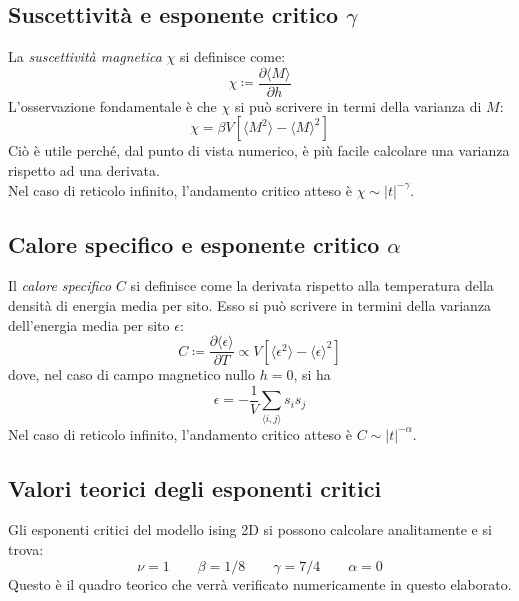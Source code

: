 \documentclass[10pt,a4paper]{article}
\begin{document}
\subsection*{Suscettività e esponente critico $\gamma$}
La \emph{suscettività magnetica} $\chi$ si definisce come:
\begin{equation}\label{eq:suscettivita}
	\chi \coloneqq\frac{\partial \langle M \rangle}{\partial h} 
\end{equation}
L'osservazione fondamentale è che $\chi$ si può scrivere in termi della varianza di $M$:
\begin{equation}\label{eq:fluttuazionesuscettivita}
\chi= \beta V[\langle M ^2 \rangle - \langle M\rangle^2] 
\end{equation}
Ciò è utile perché, dal punto di vista numerico, è più facile calcolare una varianza rispetto ad una derivata.\\
Nel caso di reticolo infinito, l'andamento critico atteso è $\chi \sim |t|^{-\gamma}$.

\subsection*{Calore specifico  e esponente critico $\alpha$}
Il \emph{calore specifico} $C$ si definisce come la derivata rispetto alla temperatura della densità di energia media per sito. Esso si può scrivere in termini della varianza dell'energia media per sito $\epsilon$:
\begin{equation}
C \coloneqq \frac{\partial \langle \epsilon \rangle}{\partial T} \propto V [\langle \epsilon ^2 \rangle - \langle \epsilon \rangle^2] 
\label{eq:calorespecifico}
\end{equation}
dove, nel caso di campo magnetico nullo $h=0$, si ha
\begin{equation}
\epsilon=-\frac{1}{V}\sum_{\langle i,j\rangle}s_i s_j
\label{enpersito}
\end{equation}
Nel caso di reticolo infinito, l'andamento critico atteso è $C\sim |t|^{-\alpha}$.
 \subsection{Valori teorici degli esponenti critici}
Gli esponenti critici del modello ising 2D si possono calcolare analitamente e si trova:
\begin{equation*}
\nu =1  \qquad \beta =1/8 \qquad \gamma = 7/4  \qquad \alpha = 0 
\end{equation*}
Questo è il quadro teorico che verrà verificato numericamente in questo elaborato.
\end{document}
